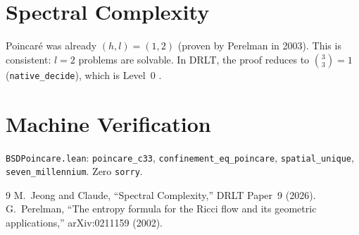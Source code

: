 \documentclass[12pt]{article}
\theoremstyle{remark}
\begin{document}
\section{Spectral Complexity}

Poincar\'e was already $(h, l) = (1, 2)$ (proven by
Perelman in 2003). This is consistent: $l = 2$ problems
are solvable. In DRLT, the proof reduces to
$\binom{3}{3} = 1$ (\texttt{native\_decide}), which is
Level~0 \cite{Paper9}.

\section{Machine Verification}

\texttt{BSDPoincare.lean}: \texttt{poincare\_c33},
\texttt{confinement\_eq\_poincare},
\texttt{spatial\_unique}, \texttt{seven\_millennium}.
Zero \texttt{sorry}.

\begin{thebibliography}{9}
 M.~Jeong and Claude, ``Spectral Complexity,''
  DRLT Paper~9 (2026).
 G.~Perelman, ``The entropy formula for the
  Ricci flow and its geometric applications,'' arXiv:0211159 (2002).
\end{thebibliography}
\end{document}
